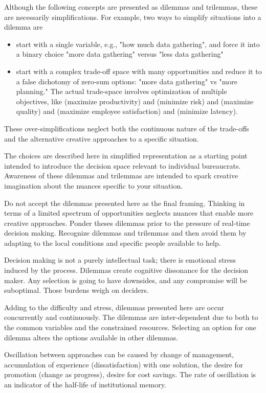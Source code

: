 Although the following concepts are presented as dilemmas and trilemmas, these are necessarily simplifications. For example, two ways to simplify situations into a dilemma are
\begin{itemize}
    \item start with a single variable, e.g., "how much data gathering", and force it into a binary choice "more data gathering" versus "less data gathering"
    \item start with a complex trade-off space with many opportunities and reduce it to a false dichotomy of zero-sum options: "more data gathering" vs "more planning." The actual trade-space involves optimization of multiple objectives, like (maximize productivity) and (minimize risk) and (maximize quality) and (maximize employee satisfaction) and (minimize latency). 
\end{itemize}
These over-simplifications neglect both the continuous nature of the trade-offs and the alternative creative approaches to a specific situation. 

The choices are described here in simplified representation as a starting point intended to introduce the decision space relevant to individual bureaucrats. Awareness of these dilemmas and trilemmas are intended to spark creative imagination about the nuances specific to your situation.

Do not accept the dilemmas presented here as the final framing. Thinking in terms of a limited spectrum of opportunities neglects nuances that enable more creative approaches. Ponder theses dilemmas prior to the pressure of real-time decision making.  Recognize dilemmas and trilemmas and then avoid them by adapting to the local conditions and specific people available to help.


Decision making is not a purely intellectual task; there is emotional stress induced by the process. Dilemmas create cognitive dissonance for the decision maker. Any selection is going to have downsides, and any compromise will be suboptimal. Those burdens weigh on deciders.

Adding to the difficulty and stress, dilemmas presented here are occur concurrently and continuously. The dilemmas are inter-dependent due to both to the common variables and the constrained resources.
Selecting an option for one dilemma alters the options available in other dilemmas.

Oscillation between approaches can be caused by change of management, accumulation of experience (dissatisfaction) with one solution, the desire for promotion (change as progress), desire for cost savings. The rate of oscillation is an indicator of the half-life of institutional memory. 



